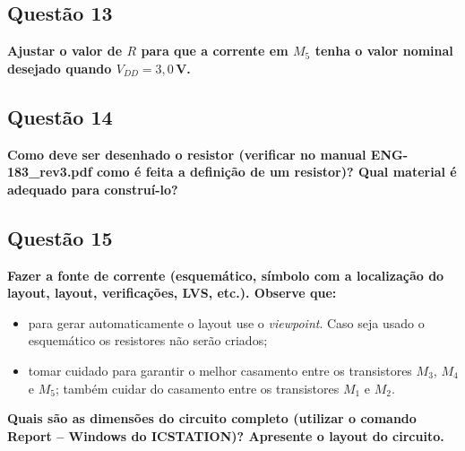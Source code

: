 ﻿\documentclass[12pt,a4paper]{article}
\begin{document}
\subsection*{Questão 13}
\begin{BoxQ}
	\textbf{Ajustar o valor de $R$ para que a corrente em $M_{5}$ tenha o valor nominal desejado quando $V_{DD} = 3{,}0$\,V.}
\end{BoxQ}

\subsection*{Questão 14}
\begin{BoxQ}
    \textbf{Como deve ser desenhado o resistor (verificar no manual ENG-183\_rev3.pdf como é feita a definição de um resistor)? Qual material é adequado para construí-lo?}
\end{BoxQ}

\subsection*{Questão 15}
\begin{BoxQ}
    \textbf{Fazer a fonte de corrente (esquemático, símbolo com a localização do layout, layout, verificações, LVS, etc.). Observe que:}
\begin{itemize}
    \item para gerar automaticamente o layout use o \emph{viewpoint}. Caso seja usado o esquemático os resistores não serão criados;
    \item tomar cuidado para garantir o melhor casamento entre os transistores $M_{3}$, $M_{4}$ e $M_{5}$; também cuidar do casamento entre os transistores $M_{1}$ e $M_{2}$.
\end{itemize}
    \textbf{Quais são as dimensões do circuito completo (utilizar o comando Report -- Windows do ICSTATION)? Apresente o layout do circuito.}
\end{BoxQ}
\end{document}
